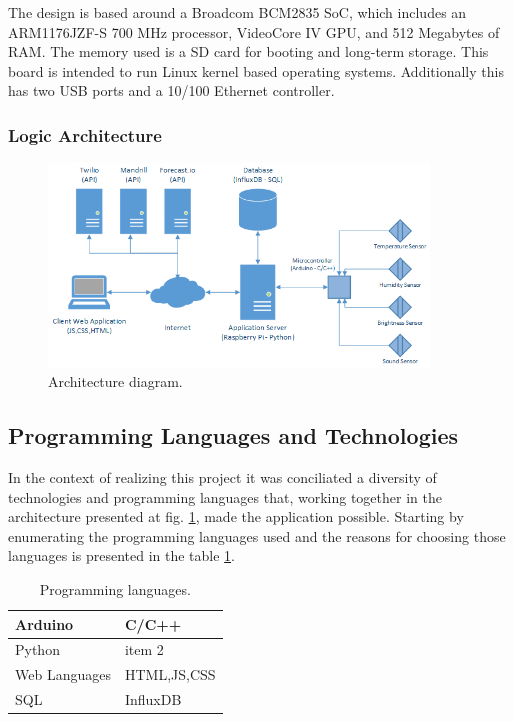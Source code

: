 \documentclass[12pt]{report}
\begin{document}
The design is based around a Broadcom BCM2835 SoC, which includes an ARM1176JZF-S 700 MHz processor, VideoCore IV GPU, and 512 Megabytes of RAM. The memory used is a SD card for booting and long-term storage. This board is intended to run Linux kernel based operating systems. Additionally this has two USB ports and a 10/100 Ethernet controller.

\subsubsection{Logic Architecture}

\begin{figure}[H]
    \centering
    \includegraphics[width=0.9\textwidth]{arc.png}
    \caption{Architecture diagram.}
    \label{fig:arc}
\end{figure}

\subsection{Programming Languages and Technologies}

In the context of realizing this project it was conciliated a diversity of technologies and programming languages that, working together in the architecture presented at fig. \ref{fig:arc}, made the application possible. Starting by enumerating the programming languages used and the reasons for choosing those languages is presented in the table \ref{tab:prolangs}.


\begin{table}[H]
\begin{tabularx}{\textwidth}{ |l|X| }
  	\hline
  	Arduino  & C/C++  \\
 	\hline
 	Python  & item 2   \\
  	\hline
 	Web Languages  & HTML,JS,CSS   \\
	\hline
	SQL  & InfluxDB   \\
	\hline
\end{tabularx}
	\caption{Programming languages.}
  	\label{tab:prolangs}
\end{table}
\end{document}
